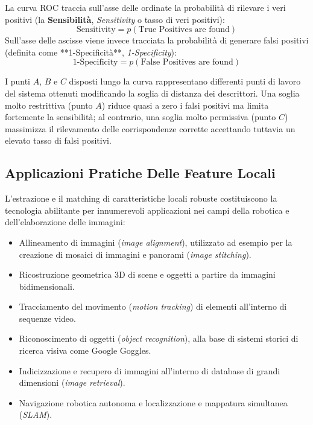 ﻿\documentclass[11pt, a4paper]{article}
\begin{document}

La curva ROC traccia sull'asse delle ordinate la probabilità di rilevare i veri positivi (la \textbf{Sensibilità}, \emph{Sensitivity} o tasso di veri positivi):
\[ \text{Sensitivity} = p(\text{True Positives are found}) \]
Sull'asse delle ascisse viene invece tracciata la probabilità di generare falsi positivi (definita come **1-Specificità**, \emph{1-Specificity}):
\[ \text{1-Specificity} = p(\text{False Positives are found}) \]

I punti $A$, $B$ e $C$ disposti lungo la curva rappresentano differenti punti di lavoro del sistema ottenuti modificando la soglia di distanza dei descrittori. Una soglia molto restrittiva (punto $A$) riduce quasi a zero i falsi positivi ma limita fortemente la sensibilità; al contrario, una soglia molto permissiva (punto $C$) massimizza il rilevamento delle corrispondenze corrette accettando tuttavia un elevato tasso di falsi positivi.

\subsection{Applicazioni Pratiche Delle Feature Locali}

L'estrazione e il matching di caratteristiche locali robuste costituiscono la tecnologia abilitante per innumerevoli applicazioni nei campi della robotica e dell'elaborazione delle immagini:
\begin{itemize}
    \item Allineamento di immagini (\emph{image alignment}), utilizzato ad esempio per la creazione di mosaici di immagini e panorami (\emph{image stitching}).
    \item Ricostruzione geometrica 3D di scene e oggetti a partire da immagini bidimensionali.
    \item Tracciamento del movimento (\emph{motion tracking}) di elementi all'interno di sequenze video.
    \item Riconoscimento di oggetti (\emph{object recognition}), alla base di sistemi storici di ricerca visiva come Google Goggles.
    \item Indicizzazione e recupero di immagini all'interno di database di grandi dimensioni (\emph{image retrieval}).
    \item Navigazione robotica autonoma e localizzazione e mappatura simultanea (\emph{SLAM}).
\end{itemize}
\end{document}
